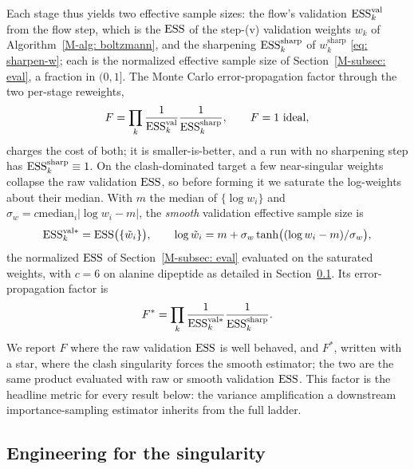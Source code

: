 \documentclass{article}
\begin{document}
Each stage thus yields two effective sample sizes: the flow's validation $\mathrm{ESS}^{\mathrm{val}}_k$ from the flow step, which is the $\mathrm{ESS}$ of the step-(v) validation weights $w_k$ of Algorithm~\ref{M-alg: boltzmann}, and the sharpening $\mathrm{ESS}^{\mathrm{sharp}}_k$ of $w^{\mathrm{sharp}}_k$ \eqref{eq: sharpen-w}; each is the normalized effective sample size of Section~\ref{M-subsec: eval}, a fraction in $(0,1]$. The Monte Carlo error-propagation factor through the two per-stage reweights,
\begin{equation}
    F = \prod_{k} \frac{1}{\mathrm{ESS}^{\mathrm{val}}_k}\frac{1}{\mathrm{ESS}^{\mathrm{sharp}}_k}, \qquad F = 1 \ \text{ideal},
    \label{eq: F}
\end{equation}
charges the cost of both; it is smaller-is-better, and a run with no sharpening step has $\mathrm{ESS}^{\mathrm{sharp}}_k \equiv 1$. On the clash-dominated target a few near-singular weights collapse the raw validation $\mathrm{ESS}$, so before forming it we saturate the log-weights about their median. With $m$ the median of $\{\log w_i\}$ and $\sigma_w = c\mathrm{median}_i|\log w_i - m|$, the \emph{smooth} validation effective sample size is
\begin{equation}
    \mathrm{ESS}^{\mathrm{val}*}_k = \mathrm{ESS}\big(\{\tilde w_i\}\big), \qquad
    \log\tilde w_i = m + \sigma_w\tanh\!\big((\log w_i - m)/\sigma_w\big),
    \label{eq: smooth-ess}
\end{equation}
the normalized $\mathrm{ESS}$ of Section~\ref{M-subsec: eval} evaluated on the saturated weights, with $c = 6$ on alanine dipeptide as detailed in Section~\ref{sec: mol-engineering}. Its error-propagation factor is
\begin{equation}
    F^{*} = \prod_{k} \frac{1}{\mathrm{ESS}^{\mathrm{val}*}_k}\frac{1}{\mathrm{ESS}^{\mathrm{sharp}}_k}.
    \label{eq: Fstar}
\end{equation}
We report $F$ where the raw validation $\mathrm{ESS}$ is well behaved, and $F^{*}$, written with a star, where the clash singularity forces the smooth estimator; the two are the same product evaluated with raw or smooth validation $\mathrm{ESS}$. This factor is the headline metric for every result below: the variance amplification a downstream importance-sampling estimator inherits from the full ladder.

\subsection{Engineering for the singularity}
\label{sec: mol-engineering}
\end{document}
